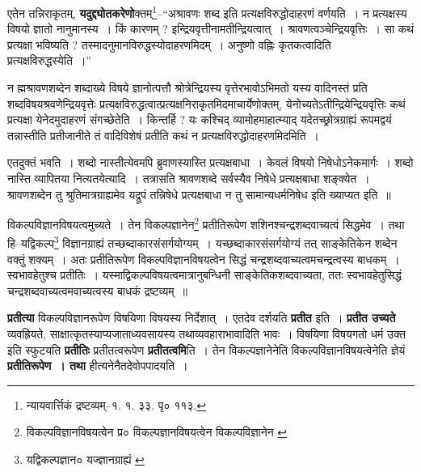 \documentclass[article,12pt,a4paper]{memoir}
\begin{document}
	  \pstart एतेन तन्निराकृतम्, \textbf{यदुद्द्योतकरेणो}क्तम्\footnote{न्यायवार्त्तिकं द्रष्टव्यम्--१. १. ३३. पृ० ११३.}\---“अश्रावणः शब्द इति प्रत्यक्षविरुद्धोदाहरणं वर्णयति । न प्रत्यक्षस्य विषयो ज्ञातो नानुमानस्य । किं कारणम् ? इन्द्रियवृत्तीनामतीन्द्रियत्वात् । श्रावणत्वञ्चेन्द्रियवृत्तिः । सा कथं प्रत्यक्षा भविष्यति ? तस्मादनुमानविरुद्धस्योदाहरणमिदम् । अनुष्णो वह्निः कृतकत्वादिति प्रत्यक्षविरुद्धस्येति ।”
	\pend
      

	  \pstart न ह्मश्रावणशब्देन शब्दाख्ये विषये ज्ञानोत्पत्तौ श्रोत्रेन्द्रियस्य वृत्तेरभावोऽभिमतो यस्य वादिनस्तं प्रति शब्दविषयश्रवणेन्द्रियवृत्तेः प्रत्यक्षविरुद्धत्वात्प्रत्यक्षनिराकृतमिदमाचार्येणोक्तम्, येनोच्यतेऽतीन्द्रियेन्द्रियवृत्तिः कथं प्रत्यक्षा येनेदमुदाहरणं संगच्छेतेति । किन्तर्हि ? यः कश्चिद् व्यामोहमाहात्म्याद् यदेतच्छ्रोत्रग्राह्यं रूपमद्वयं तन्नास्तीति प्रतीजानीते तं वादिविशेषं प्रतीति कथं न प्रत्यक्षविरुद्धोदाहरणमिदमिति ।
	\pend
      

	  \pstart एतदुक्तं भवति । शब्दो नास्तीत्येवमपि ब्रुवाणस्यास्ति प्रत्यक्षबाधा । केवलं विषयो निषेधोऽनेकमार्गः । शब्दो नास्ति व्यापितया नित्यतयेत्यादि । तत्रासति श्रावणशब्दे सर्वस्यैव निषेधे प्रत्यक्षबाधा शङ्क्येत । श्रावणशब्देन तु श्रुतिमात्रग्राह्यमेव यद्रूपं तन्निषेधे प्रत्यक्षबाधा न तु सामान्यधर्मनिषेध इति ख्याप्यत इति ॥
	\pend
	  \bigskip
	  \begingroup
	

	  \pstart विकल्पविज्ञानविषयत्वमुच्यते । तेन विकल्पज्ञानेन\footnote{विकल्पविज्ञानविषयत्वेन प्र० \cite{dp-msB} \cite{dp-edP} \cite{dp-edH} \cite{dp-edE} विकल्पज्ञानविषयत्वेन \cite{dp-msC} \cite{dp-msD} विकल्पविज्ञानेन \cite{dp-msA}} प्रतीतिरूपेण शशिनश्चन्द्रशब्दवाच्यत्वं सिद्धमेव । तथा हि--यद्विकल्प\footnote{यद्विकल्पज्ञान० \cite{dp-msB} \cite{dp-edP} \cite{dp-edH} \cite{dp-edN} यज्ज्ञानग्राह्यं \cite{dp-msA}} विज्ञानग्राह्यं तच्छब्दाकारसंसर्गयोग्यम् । यच्छब्दाकारसंसर्गयोग्यं तत् साङ्केतिकेन शब्देन वक्तुं शक्यम् । अतः प्रतीतिरूपेण विकल्पविज्ञानविषयत्वेन सिद्धं चन्द्रशब्दवाच्यत्वमचन्द्रत्वस्य बाधकम् । स्वभावहेतुश्च प्रतीतिः । यस्माद्विकल्पविषयत्वमात्रानुबन्धिनी साङ्केतिकशब्दवाच्यता, ततः स्वभावहेतुसिद्धं चन्द्रशब्दवाच्यत्वमवाच्यत्वस्य बाधकं द्रष्टव्यम् ॥
	\pend
      
	  \endgroup
	

	  \pstart \textbf{प्रतीत्या} विकल्पविज्ञानरूपेण विषयिणा विषयस्य निर्देशात् । एतदेव दर्शयति \textbf{प्रतीत} इति । \textbf{प्रतीत उच्यते} व्यवह्रियते, साक्षात्कृतस्याप्यजाताध्यवसायस्य तथाव्यवहाराभावादिति भावः । विषयिणा विषयगतो धर्म उक्त इति स्फुटयति \textbf{प्रतीतिः} प्रतीतत्वरूपेण \textbf{प्रतीतत्वमि}ति । तेन विकल्पज्ञानेनेति विकल्पविज्ञानविषयत्वेनेति ज्ञेयं \textbf{प्रतीतिरूपेण । तथा} हीत्यनेनैतदेवोपपादयति ।
	\pend
      
\end{document}

